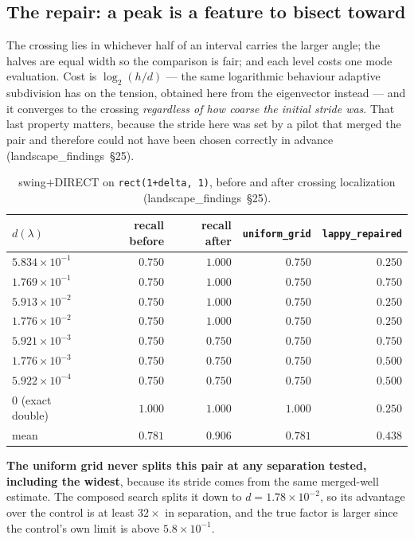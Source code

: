\documentclass[11pt]{article}
\newcommand{\lf}[1]{(landscape\_findings~\S#1)}
\newcommand{\lam}{\lambda}
\begin{document}
\subsection{The repair: a peak is a feature to bisect toward}

The crossing lies in whichever half of an interval carries the larger angle; the halves are equal
width so the comparison is fair; and each level costs one mode evaluation. Cost is
$\log_2(h/d)$ --- the same logarithmic behaviour adaptive subdivision has on the tension, obtained
here from the eigenvector instead --- and it converges to the crossing \emph{regardless of how
coarse the initial stride was}. That last property matters, because the stride here was set by a
pilot that merged the pair and therefore could not have been chosen correctly in advance \lf{25}.

\begin{table}[htbp]
\centering
\caption{swing$+$DIRECT on \texttt{rect(1+delta, 1)}, before and after crossing localization
\lf{25}.}
\label{tab:rectpair}
\begin{tabular}{lrrrr}
\toprule
$d(\lam)$ & recall before & recall after & \verb|uniform_grid| & \verb|lappy_repaired| \\
\midrule
$5.834\times10^{-1}$ & $0.750$ & $1.000$ & $0.750$ & $0.250$ \\
$1.769\times10^{-1}$ & $0.750$ & $1.000$ & $0.750$ & $0.750$ \\
$5.913\times10^{-2}$ & $0.750$ & $1.000$ & $0.750$ & $0.250$ \\
$1.776\times10^{-2}$ & $0.750$ & $1.000$ & $0.750$ & $0.250$ \\
$5.921\times10^{-3}$ & $0.750$ & $0.750$ & $0.750$ & $0.750$ \\
$1.776\times10^{-3}$ & $0.750$ & $0.750$ & $0.750$ & $0.500$ \\
$5.922\times10^{-4}$ & $0.750$ & $0.750$ & $0.750$ & $0.500$ \\
$0$ (exact double)   & $1.000$ & $1.000$ & $1.000$ & $0.250$ \\
\midrule
mean                 & $0.781$ & $0.906$ & $0.781$ & $0.438$ \\
\bottomrule
\end{tabular}
\end{table}

\textbf{The uniform grid never splits this pair at any separation tested, including the widest},
because its stride comes from the same merged-well estimate. The composed search splits it down to
$d = 1.78\times10^{-2}$, so its advantage over the control is at least $32\times$ in separation,
and the true factor is larger since the control's own limit is above $5.8\times10^{-1}$.
\end{document}
